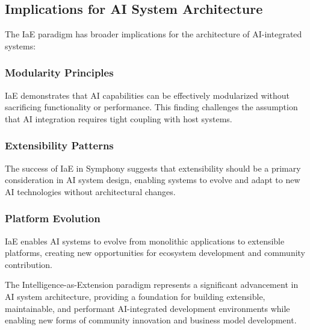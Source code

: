\subsection{Implications for AI System Architecture}

The IaE paradigm has broader implications for the architecture of AI-integrated systems:

\subsubsection{Modularity Principles}

IaE demonstrates that AI capabilities can be effectively modularized without sacrificing functionality or performance. This finding challenges the assumption that AI integration requires tight coupling with host systems.

\subsubsection{Extensibility Patterns}

The success of IaE in Symphony suggests that extensibility should be a primary consideration in AI system design, enabling systems to evolve and adapt to new AI technologies without architectural changes.

\subsubsection{Platform Evolution}

IaE enables AI systems to evolve from monolithic applications to extensible platforms, creating new opportunities for ecosystem development and community contribution.

The Intelligence-as-Extension paradigm represents a significant advancement in AI system architecture, providing a foundation for building extensible, maintainable, and performant AI-integrated development environments while enabling new forms of community innovation and business model development.
